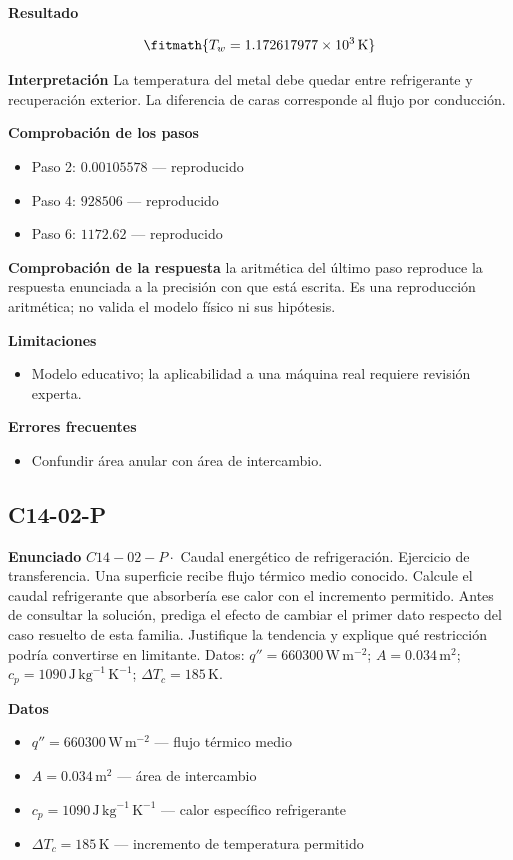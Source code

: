 \documentclass[10pt,openany]{book}
\begin{document}
\noindent\textbf{Resultado}

\[
\fitmath{T_w=1.172617977\times10^{3}\,\mathrm{K}}
\]

\noindent\textbf{Interpretación}
La temperatura del metal debe quedar entre refrigerante y recuperación exterior. La diferencia de caras corresponde al flujo por conducción.

\noindent\textbf{Comprobación de los pasos}
\begin{itemize}
\item Paso 2: $0.00105578$ — reproducido
\item Paso 4: $928506$ — reproducido
\item Paso 6: $1172.62$ — reproducido
\end{itemize}

\noindent\textbf{Comprobación de la respuesta} la aritmética del último paso reproduce la respuesta enunciada a la precisión con que está escrita. Es una reproducción aritmética; no valida el modelo físico ni sus hipótesis.

\noindent\textbf{Limitaciones}
\begin{itemize}
\item Modelo educativo; la aplicabilidad a una máquina real requiere revisión experta.
\end{itemize}

\noindent\textbf{Errores frecuentes}
\begin{itemize}
\item Confundir área anular con área de intercambio.
\end{itemize}
\subsection*{C14-02-P}

\noindent\textbf{Enunciado}
\(C14-02-P \cdot\) Caudal energético de refrigeración. Ejercicio de transferencia. Una superficie recibe flujo térmico medio conocido. Calcule el caudal refrigerante que absorbería ese calor con el incremento permitido. Antes de consultar la solución, prediga el efecto de cambiar el primer dato respecto del caso resuelto de esta familia. Justifique la tendencia y explique qué restricción podría convertirse en limitante. Datos: \(q''=660300\, \mathrm{W}\,\mathrm{m}^{-2}\); \(A=0.034\, \mathrm{m}^{2}\); \(c_p=1090\, \mathrm{J}\,\mathrm{kg}^{-1}\,\mathrm{K}^{-1}\); \(\Delta T_c=185\, \mathrm{K}\).

\noindent\textbf{Datos}
\begin{itemize}
\item $q'' = 660300\,\mathrm{W}\,\mathrm{m}^{-2}$ — flujo térmico medio
\item $A = 0.034\,\mathrm{m}^{2}$ — área de intercambio
\item $c_p = 1090\,\mathrm{J}\,\mathrm{kg}^{-1}\,\mathrm{K}^{-1}$ — calor específico refrigerante
\item $\Delta T_c = 185\,\mathrm{K}$ — incremento de temperatura permitido
\end{itemize}
\end{document}
